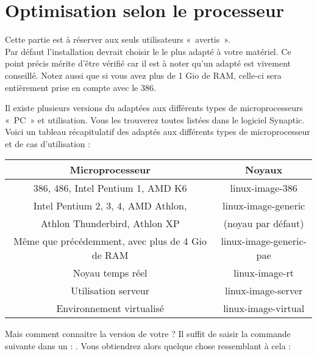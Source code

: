 \section{Optimisation selon le processeur}
Cette partie est à réserver aux seuls utilisateurs «~avertis~».\\
Par défaut l'installation devrait choisir le  le plus adapté à votre matériel. Ce point précis mérite d'être vérifié car il est à noter qu'un  adapté est vivement conseillé. Notez aussi que si vous avez plus de 1 Gio de RAM, celle-ci sera entièrement prise en compte avec le  386.\par
Il existe plusieurs versions du  adaptées aux différents types de microprocesseurs «~PC~» et utilisation. Vous les trouverez toutes listées dans le logiciel Synaptic. Voici un tableau récapitulatif des  adaptés aux différents types de microprocesseur et de cas d'utilisation :\par
\renewcommand{\multirowsetup}{\centering}
\begin{center}
\begin{tabular}{||c|c||}
\hline
\hline
Microprocesseur & Noyaux\\
\hline
\hline
386, 486, Intel Pentium 1, AMD K6 & linux-image-386\\
\hline
Intel Pentium 2, 3, 4, AMD Athlon,& linux-image-generic\\
Athlon Thunderbird, Athlon XP & (noyau par défaut)\\
\hline
Même que précédemment, avec plus de 4 Gio de RAM& linux-image-generic-pae\\
\hline
Noyau temps réel & linux-image-rt\\
\hline
Utilisation serveur & linux-image-server\\
\hline
Environnement virtualisé & linux-image-virtual\\
\hline
\hline
\end{tabular}
\end{center}\par
Mais comment connaitre la version de votre  ? Il suffit de saisir la commande suivante dans un  : . Vous obtiendrez alors quelque chose ressemblant à cela : 

